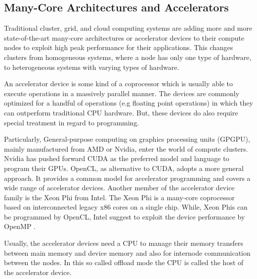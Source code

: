\subsection{Many-Core Architectures and Accelerators}
\label{sec:accel}

Traditional cluster, grid, and cloud computing systems are adding more
and more state-of-the-art many-core architectures or accelerator
devices to their compute nodes to exploit high peak performance for
their applications. This changes clusters from homogeneous systems,
where a node has only one type of hardware, to heterogeneous systems
with varying types of hardware.

An accelerator device is some kind of a coprocessor which is usually
able to execute operations in a massively parallel manner.  The
devices are commonly optimized for a handful of operations (e.g
floating point operations) in which they can outperform traditional
CPU hardware. But, these devices do also require special treatment in
regard to programming.

Particularly, General-purpose computing on graphics processing units
(GPGPU), mainly manufactured from AMD or Nvidia, enter the world of
compute clusters. Nvidia has pushed forward CUDA\cite{ref:cuda} as the
preferred model and language to program their
GPUs. OpenCL\cite{ref:opencl}, as alternative to CUDA, adopts a more
general approach.  It provides a common model for accelerator
programming and covers a wide range of accelerator devices.  Another
member of the accelerator device family is the Xeon
Phi\cite{ref:xeon_phi} from Intel. The Xeon Phi is a many-core
coprocessor based on interconnected legacy x86 cores on a single
chip. While, Xeon Phis can be programmed by OpenCL, Intel suggest to
exploit the device performance by OpenMP \cite{ref:openmp}.

Usually, the accelerator devices need a CPU to manage their memory
transfers between main memory and device memory and also for internode
communication between the nodes. In this so called offload mode the
CPU is called the host of the accelerator device.

